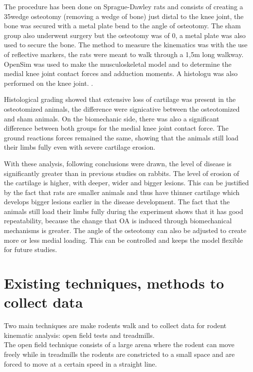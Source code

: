 The procedure has been done on Sprague-Dawley rats and consists of creating a 35\degree wedge osteotomy (removing a wedge of bone) just distal to the knee joint, the bone was secured with a metal plate bend to the angle of osteotomy. The sham group also underwent surgery but the osteotomy was of 0\degree , a metal plate was also used to secure the bone. The method to measure the kinematics was with the use of reflective markers, the rats were meant to walk through a 1,5m long walkway. OpenSim was used to make the musculoskeletal model and to determine the medial knee joint contact forces and adduction moments. A histologu was also performed on the knee joint. .

Histological grading showed that extensive loss of cartilage was present in the osteotomized animals, the difference were signicative between the osteotomized and sham animals. On the biomechanic side, there was also a significant difference between both groups for the medial knee joint contact force. The ground reactions forces remained the same, showing that the animals still load their limbs fully even with severe cartilage erosion.

With these analysis, following conclusions were drawn, the level of disease is significantly greater than in previous studies on rabbits. The level of erosion of the cartilage is higher, with deeper, wider and bigger lesions. This can be justified by the fact that rats are smaller animals and thus have thinner cartilage which develops bigger lesions earlier in the disease development. The fact that the animals still load their limbs fully during the experiment shows that it has good repeatability, because the change that OA is induced through biomechanical mechanisms is greater. The angle of the osteotomy can also be adjusted to create more or less medial loading. This can be controlled and keeps the model flexible for future studies.

\section{Existing techniques, methods to collect data}

Two main techniques are make rodents walk and to collect data for rodent kinematic analysis: open field tests and treadmills.\\

The open field technique consists of a large arena where the rodent can move freely while in treadmills the rodents are constricted to a small space and are forced to move at a certain speed in a straight line.

